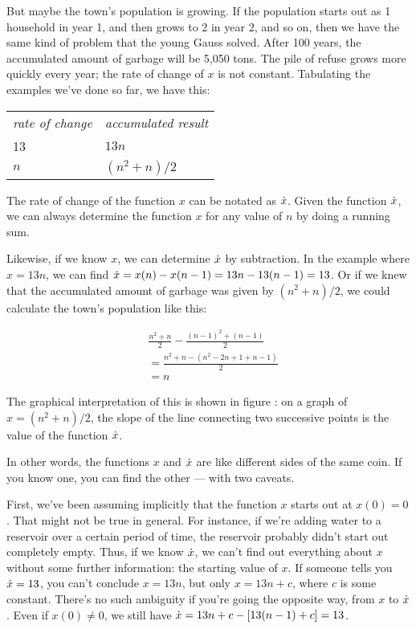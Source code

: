 But maybe the town's population is growing. If the population starts out
as 1 household in year 1, and then grows to 2 in year 2, and so on, then
we have the same kind of problem that the young Gauss solved. After 100
years, the accumulated amount of garbage will be 5,050 tons. The pile of
refuse grows more quickly every year; the rate of change of $x$ is not
constant. Tabulating the examples we've done so far, we have this:

\noindent\begin{tabular}{p{23mm}p{23mm}}
\emph{rate of change} & \emph{accumulated result} \\
13             & $13n$ \\
$n$            & $(n^2+n)/2$
\end{tabular}


The rate of change of the function $x$ can be notated as $\dot{x}$.
Given the function $\dot{x}$, we can always determine the function $x$
for any value of $n$ by doing a running sum.

Likewise, if we know
$x$, we can determine $\dot{x}$ by subtraction. In the example
where $x=13n$, we can find $\dot{x}=x(n)-x(n-1)=13n-13(n-1)=13$.
Or if we knew that the accumulated amount of garbage was given by
$(n^2+n)/2$, we could calculate the town's population like
this:

\begin{align*}
  & \frac{n^2+n}{2} - \frac{(n-1)^2+(n-1)}{2}\\
   &= \frac{n^2+n-\left(n^2-2n+1+n-1\right)}{2} \\
   &= n
\end{align*}



The graphical interpretation of this is shown in figure
: on a graph of $x=(n^2+n)/2$, the slope of the line connecting two successive points is the value of the function $\dot{x}$.

In other words, the functions $x$ and $\dot{x}$ are like different
sides of the same coin. If you know one, you can find the other
--- with two caveats.

First, we've been assuming implicitly
that the function $x$ starts out at $x(0)=0$. That might not be
true in general. For instance, if we're adding water to a reservoir
over a certain period of time, the reservoir probably didn't start
out completely empty. Thus, if we know $\dot{x}$, we can't
find out everything about $x$ without some further information:
the starting value of $x$. If someone tells you $\dot{x}=13$,
you can't conclude $x=13n$, but only $x=13n+c$, where $c$ is
some constant. There's no such ambiguity if you're going the
opposite way, from $x$ to $\dot{x}$. Even if $x(0)\ne 0$, we
still have $\dot{x}=13n+c-[13(n-1)+c]=13$.

